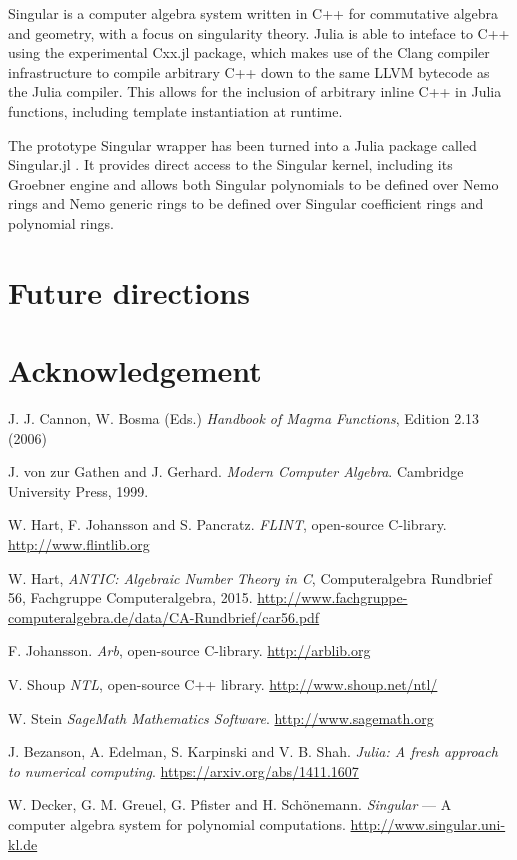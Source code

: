 \documentclass{sig-alternate-05-2015}
\begin{document}
Singular \cite{singular} is a computer algebra system written in C++ for commutative algebra
and geometry, with a focus on singularity theory. Julia is able to inteface to C++ using
the experimental Cxx.jl package, which makes use of the Clang compiler infrastructure to
compile arbitrary C++ down to the same LLVM bytecode as the Julia compiler. This allows
for the inclusion of arbitrary inline C++ in Julia functions, including template 
instantiation at runtime.

The prototype Singular wrapper has been turned into a Julia package called Singular.jl
\cite{singular.jl}. It provides direct access to the Singular kernel, including its
Groebner engine and allows both Singular polynomials to be defined over Nemo rings and Nemo
generic rings to be defined over Singular coefficient rings and polynomial rings.

\section{Future directions}

\section{Acknowledgement}


\begin{thebibliography}{99}

J. J. Cannon, W. Bosma (Eds.) {\em Handbook of Magma Functions}, Edition 2.13 (2006)

J. von zur Gathen and J. Gerhard. {\em Modern Computer Algebra}. Cambridge University Press, 1999.

W. Hart, F. Johansson and S. Pancratz. {\em FLINT}, open-source C-library. \url{http://www.flintlib.org}

W. Hart, {\em ANTIC: Algebraic Number Theory in C}, Computeralgebra Rundbrief 56, Fachgruppe Computeralgebra, 2015. \url{http://www.fachgruppe-computeralgebra.de/data/CA-Rundbrief/car56.pdf}

F. Johansson. {\em Arb}, open-source C-library. \url{http://arblib.org}

V. Shoup {\em NTL}, open-source C++ library. \url{http://www.shoup.net/ntl/}

W. Stein {\em SageMath Mathematics Software}.  \url{http://www.sagemath.org}

 J. Bezanson, A. Edelman, S. Karpinski and V. B. Shah. {\em Julia: A fresh approach to numerical computing}. \url{https://arxiv.org/abs/1411.1607}

 W. Decker, G. M. Greuel, G. Pfister and H. Sch\"onemann. {\em Singular} --- A computer algebra system for polynomial computations. \url{http://www.singular.uni-kl.de}

\end{thebibliography}
\end{document}
